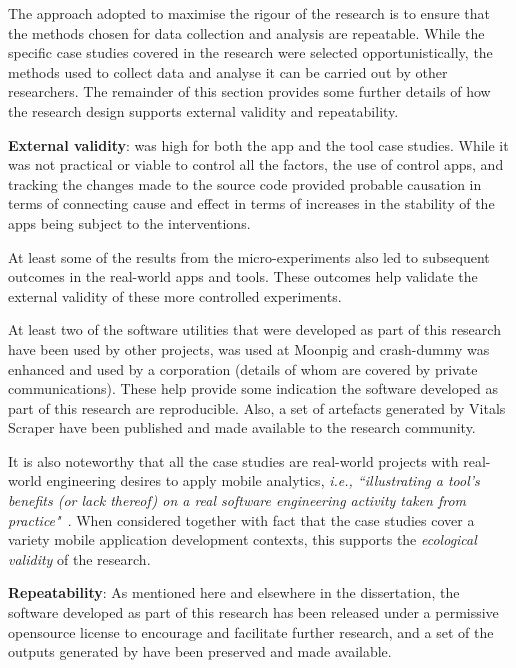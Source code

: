 The approach adopted to maximise the rigour of the research is to ensure that the methods chosen for data collection and analysis are repeatable. While the specific case studies covered in the research were selected opportunistically, the methods used to collect data and analyse it can be carried out by other researchers. The remainder of this section provides some further details of how the research design supports external validity and repeatability.

\textbf{External validity}: was high for both the app and the tool case studies. While it was not practical or viable to control all the factors, the use of control apps, and tracking the changes made to the source code provided probable causation in terms of connecting cause and effect in terms of increases in the stability of the apps being subject to the interventions.

At least some of the results from the micro-experiments also led to subsequent outcomes in the real-world apps and tools. These outcomes help validate the external validity of these more controlled experiments. 

At least two of the software utilities that were developed as part of this research have been used by other projects,  was used at Moonpig and crash-dummy was enhanced and used by a corporation (details of whom are covered by private communications). These help provide some indication the software developed as part of this research are reproducible. Also, a set of artefacts generated by Vitals Scraper have been published and made available to the research community. 

 It is also noteworthy that all the case studies  are real-world projects with real-world engineering desires to apply mobile analytics, \emph{i.e., ``illustrating a tool’s benefits (or lack thereof) on a real software engineering activity taken from practice"}~. When considered together with fact that the case studies cover a variety mobile application development contexts, this supports the \emph{ecological validity} of the research.

\textbf{Repeatability}:
As mentioned here and elsewhere in the dissertation, the software developed as part of this research has been released under a permissive opensource license to encourage and facilitate further research, and a set of the outputs generated by  have been preserved and made available.


